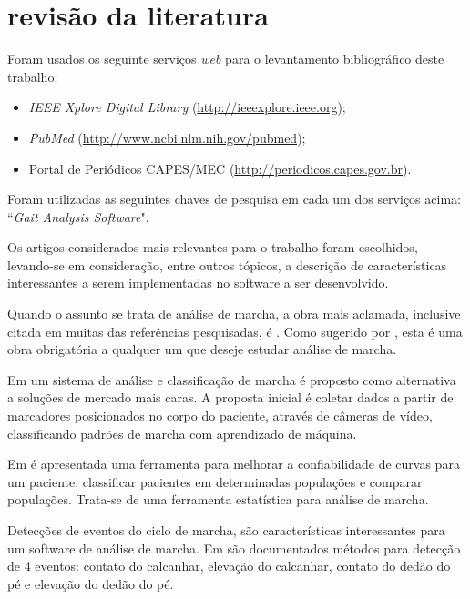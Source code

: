 \section[REVISÃO DA LITERATURA]{revisão da literatura}
Foram usados os seguinte serviços \emph{web} para o levantamento bibliográfico deste trabalho:
\begin{itemize}
	\item \emph{IEEE Xplore Digital Library} (\href{http://ieeexplore.ieee.org}{http://ieeexplore.ieee.org});
	\item \emph{PubMed} (\href{http://www.ncbi.nlm.nih.gov/pubmed}{http://www.ncbi.nlm.nih.gov/pubmed});
	\item Portal de Periódicos CAPES/MEC (\href{http://periodicos.capes.gov.br}{http://periodicos.capes.gov.br}).
\end{itemize}

Foram utilizadas as seguintes chaves de pesquisa em cada um dos serviços acima: ``\emph{Gait Analysis Software}".

Os artigos considerados mais relevantes para o trabalho foram escolhidos, levando-se em consideração, entre outros tópicos, a descrição de características interessantes a serem implementadas no software a ser desenvolvido.

Quando o assunto se trata de análise de marcha, a obra mais aclamada, inclusive citada em muitas das referências pesquisadas, é .
Como sugerido por , esta é uma obra obrigatória a qualquer um que deseje estudar análise de marcha.

Em  um sistema de análise e classificação de marcha é proposto como alternativa a soluções de mercado mais caras.
A proposta inicial é coletar dados a partir de marcadores posicionados no corpo do paciente, através de câmeras de vídeo, classificando padrões de marcha com aprendizado de máquina.

Em  é apresentada uma ferramenta para melhorar a confiabilidade de curvas para um paciente, classificar pacientes em determinadas populações e comparar populações.
Trata-se de uma ferramenta estatística para análise de marcha.

Detecções de eventos do ciclo de marcha, são características interessantes para um software de análise de marcha. 
Em  são documentados métodos para detecção de 4 eventos: contato do calcanhar, elevação do calcanhar, contato do dedão do pé e elevação do dedão do pé.

